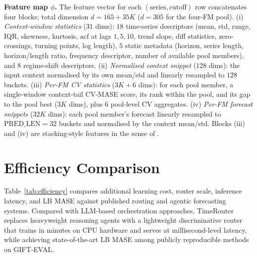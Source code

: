 \documentclass{article}
\theoremstyle{plain}
\theoremstyle{definition}
\theoremstyle{remark}
\begin{document}
\textbf{Feature map $\phi$.} The feature vector for each $(\text{series}, \text{cutoff})$ row concatenates four blocks; total dimension $d = 165 + 35K$ ($d{=}305$ for the four-FM pool). (i) \emph{Context-window statistics} ($31$ dims): $18$ time-series descriptors (mean, std, range, IQR, skewness, kurtosis, $\mathrm{acf}$ at lags $1, 5, 10$, trend slope, diff statistics, zero-crossings, turning points, log length), $5$ static metadata (horizon, series length, horizon/length ratio, frequency descriptor, number of available pool members), and $8$ regime-shift descriptors. (ii) \emph{Normalised context snippet} ($128$ dims): the input context normalised by its own mean/std and linearly resampled to $128$ buckets. (iii) \emph{Per-FM CV statistics} ($3K + 6$ dims): for each pool member, a single-window context-tail CV-MASE score, its rank within the pool, and its gap to the pool best ($3K$ dims), plus $6$ pool-level CV aggregates. (iv) \emph{Per-FM forecast snippets} ($32K$ dims): each pool member's forecast linearly resampled to $\mathrm{PRED\_LEN}=32$ buckets and normalised by the context mean/std. Blocks (iii) and (iv) are stacking-style features in the sense of \citet{wolpert1992stacking}.

\section{Efficiency Comparison}
\label{app:efficiency}

Table~\ref{tab:efficiency} compares additional learning cost, router scale, inference latency, and LB MASE against published routing and agentic forecasting systems. Compared with LLM-based orchestration approaches, TimeRouter replaces heavyweight reasoning agents with a lightweight discriminative router that trains in minutes on CPU hardware and serves at millisecond-level latency, while achieving state-of-the-art LB MASE among publicly reproducible methods on GIFT-EVAL.
\end{document}
